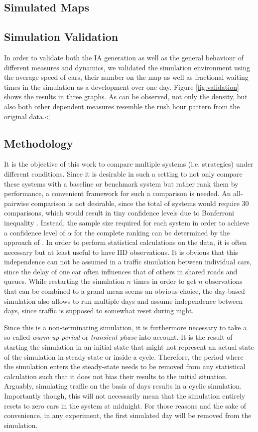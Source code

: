 \documentclass[10pt]{article}
\begin{document}
\subsection{Simulated Maps}

\subsection{Simulation Validation}
In order to validate both the IA generation as well as the general behaviour of different measures and dynamics, we validated the simulation environment using the average speed of cars, their number on the map as well as fractional waiting times in the simulation as a development over one day. Figure \ref{fig:validation} shows the results in three graphs. As can be observed, not only the density, but also both other dependent measures resemble the rush hour pattern from the original data.<

\subsection{Methodology}
It is the objective of this work to compare multiple systems (i.e. strategies) under different conditions. Since it is desirable in such a setting to not only compare these systems with a baseline or benchmark system but rather rank them by performance, a convenient framework for such a comparison is needed. An all-pairwise comparison is not desirable, since the total of  systems would require 30 comparisons, which would result in tiny confidence levels due to Bonferroni inequality \citep[see e.g.][]{law2007simulation}. Instead, the sample size required for each system in order to achieve a confidence level of $\alpha$ for the complete ranking can be determined by the approach of \citet{dudewicz1975allocation}. In order to perform statistical calculations on the data, it is often necessary but at least useful to have IID observations. It is obvious that this independence can not be assumed in a traffic simulation between individual cars, since the delay of one car often influences that of others in shared roads and queues. While restarting the simulation $n$ times in order to get $n$ observations that can be combined to a grand mean seems an obvious choice, the day-based simulation also allows to run multiple days and assume independence between days, since traffic is supposed to somewhat reset during night.

Since this is a non-terminating simulation, it is furthermore necessary to take a so called \textit{warm-up period} or \textit{transient phase} into account. It is the result of starting the simulation in an initial state that might not represent an actual state of the simulation in steady-state or inside a cycle. Therefore, the period where the simulation enters the steady-state needs to be removed from any statistical calculation such that it does not bias their results to the initial situation. Arguably, simulating traffic on the basis of days results in a cyclic simulation. Importantly though, this will not necessarily mean that the simulation entirely resets to zero cars in the system at midnight. For those reasons and the sake of convenience, in any experiment, the first simulated day will be removed from the simulation.
\end{document}
